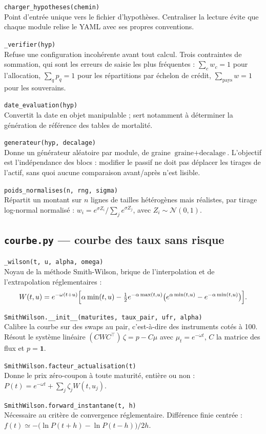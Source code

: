 \documentclass[10pt,a4paper]{article}
\newcommand{\fn}[2]{\par\smallskip\textcolor{bleufonce}{\texttt{#1}}\\ #2\par}
\begin{document}
\fn{charger\_hypotheses(chemin)}{Point d'entrée unique vers le fichier d'hypothèses. Centraliser
la lecture évite que chaque module relise le YAML avec ses propres conventions.}

\fn{\_verifier(hyp)}{Refuse une configuration incohérente avant tout calcul. Trois contraintes
de sommation, qui sont les erreurs de saisie les plus fréquentes :
$\sum_c w_c = 1$ pour l'allocation, $\sum_q p_q = 1$ pour les répartitions par échelon de crédit,
$\sum_{\text{pays}} w = 1$ pour les souverains.}

\fn{date\_evaluation(hyp)}{Convertit la date en objet manipulable ; sert notamment à déterminer
la génération de référence des tables de mortalité.}

\fn{generateur(hyp, decalage)}{Donne un générateur aléatoire par module, de graine
$\text{graine} + \text{decalage}$. L'objectif est l'indépendance des blocs : modifier le passif
ne doit pas déplacer les tirages de l'actif, sans quoi aucune comparaison avant/après n'est
lisible.}

\fn{poids\_normalises(n, rng, sigma)}{Répartit un montant sur $n$ lignes de tailles
hétérogènes mais réalistes, par tirage log-normal normalisé :
$w_i = e^{\sigma Z_i} / \sum_j e^{\sigma Z_j}$, avec $Z_i \sim \mathcal{N}(0,1)$.}

\subsection{\texttt{courbe.py} — courbe des taux sans risque}

\fn{\_wilson(t, u, alpha, omega)}{Noyau de la méthode Smith-Wilson, brique de l'interpolation et
de l'extrapolation réglementaires :
\[
W(t,u) = e^{-\omega(t+u)}\Bigl[\alpha\min(t,u) - \tfrac12 e^{-\alpha\max(t,u)}
\bigl(e^{\alpha\min(t,u)} - e^{-\alpha\min(t,u)}\bigr)\Bigr].
\]}

\fn{SmithWilson.\_\_init\_\_(maturites, taux\_pair, ufr, alpha)}{Calibre la courbe sur des swaps
au pair, c'est-à-dire des instruments cotés à 100. Résout le système linéaire
$(C W C^{\top})\,\zeta = p - C\mu$ avec $\mu_t = e^{-\omega t}$, $C$ la matrice des flux et
$p = \mathbf{1}$.}

\fn{SmithWilson.facteur\_actualisation(t)}{Donne le prix zéro-coupon à toute maturité, entière ou
non : $P(t) = e^{-\omega t} + \sum_j \zeta_j W(t,u_j)$.}

\fn{SmithWilson.forward\_instantane(t, h)}{Nécessaire au critère de convergence réglementaire.
Différence finie centrée : $f(t) \simeq -\bigl(\ln P(t+h) - \ln P(t-h)\bigr)/2h$.}
\end{document}
